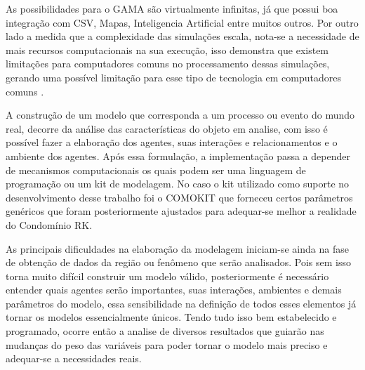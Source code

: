 As possibilidades para o GAMA são virtualmente infinitas, já que possui boa integração com CSV, Mapas, Inteligencia Artificial entre muitos outros. Por outro lado a medida que a complexidade das simulações escala, nota-se a necessidade de mais recursos computacionais na sua execução, isso demonstra que existem limitações para computadores comuns no processamento dessas simulações, gerando uma possível limitação para esse tipo de tecnologia em computadores comuns\cite{gamaplataform} .

A construção de um modelo que corresponda a um processo ou evento do mundo real, decorre da análise das características do objeto em analise, com isso é possível fazer a elaboração dos agentes, suas interações e relacionamentos e o ambiente dos agentes. Após essa formulação, a implementação passa a depender de mecanismos computacionais os quais podem ser uma linguagem de programação ou um kit de modelagem\cite{macaltutorial:online}. No caso o kit utilizado como suporte no desenvolvimento desse trabalho foi o COMOKIT que forneceu certos parâmetros genéricos que foram posteriormente ajustados para adequar-se melhor a realidade do Condomínio RK.

As principais dificuldades na elaboração da modelagem iniciam-se ainda na fase de obtenção de dados da região ou fenômeno que serão analisados. Pois sem isso torna muito difícil construir um modelo válido, posteriormente é necessário entender quais agentes serão importantes, suas interações, ambientes e demais parâmetros do modelo, essa sensibilidade na definição de todos esses elementos já tornar os modelos essencialmente únicos. Tendo tudo isso bem estabelecido e programado, ocorre então a analise de diversos resultados que guiarão nas mudanças do peso das variáveis para poder tornar o modelo mais preciso e adequar-se a necessidades reais.





 





